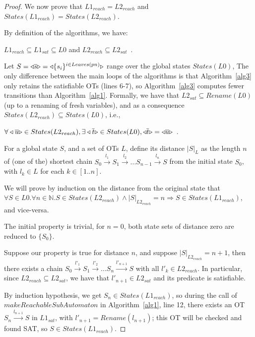 \documentclass[smallcondensed]{svjour3}
\begin{document}
\begin{proof}
\smallskip
We now prove that $L1_{reach}=L2_{reach}$ and
$States(L1_{reach})=States(L2_{reach})$.

By definition of the algorithms, we have:

\centerline{$L1_{reach} \subseteq L1_{sat} \subseteq L0$ \qquad \mbox{and}\qquad
$L2_{reach}\subseteq  L2_{sat}$\ .}

\smallskip
Let $S=\triangleleft{\overline{s}}\triangleright=\triangleleft{\{s_{i}\}^{i\in Leaves(pn)}}\triangleright$
range over the global states $States(L0)$, 
The only difference between the main loops of the algorithms is that 
Algorithm~\ref{alg3} only retains the satisfiable OTs (lines 6-7), so 
Algorithm~\ref{alg3} computes fewer transitions than
Algorithm~\ref{alg1}. Formally, we have that
$L2_{sat} \subseteq Rename(L0)$ (up to a renaming of fresh variables), and as a consequence $States(L2_{reach})\subseteq  States(L0)$, i.e.,\\
\centerline{$\forall \triangleleft{\overline{u}}\triangleright\in States(L2_{reach}), \exists\triangleleft{\overline{t}}\triangleright\in States(L0), \triangleleft{\overline{t}}\triangleright=\triangleleft{\overline{u}}\triangleright$\ .}

For a global state $S$, and a set of OTs $L$, define its distance
$|S|_L$ as the length $n$ of (one of the) shortest chain
$S_0\xrightarrow{l_1}S_1\xrightarrow{l_2}...S_{n-1}\xrightarrow{l_{n}}S$
  from the initial state $S_0$, with $l_k \in L$ for each $k\in [1..n]$.

\medskip
We will prove by induction on the distance from the original state
that\linebreak $\forall S \in L0. \forall n \in \mathbb{N}. S \in States(L2_{reach}) \land |S|_{L2_{reach}}=n \Rightarrow S
\in States(L1_{reach})$, and vice-versa.

  The initial property is trivial, for $n=0$, both state sets of
  distance zero are reduced to $\{S_0\}$.

  Suppose our property is true for distance $n$, and
  suppose $|S|_{L2_{reach}}=n+1$, then there exists a chain
  $S_0\xrightarrow{l'_1}S_1\xrightarrow{l'_2}...S_{n}\xrightarrow{l'_{n+1}}S$
  with all $l'_k \in L2_{reach}$. In particular, since
  $L2_{reach}\subseteq L2_{sat}$, we have that $l'_{n+1} \in L2_{sat}$ and
  its predicate is satisfiable.
  
  By induction hypothesis, we get $S_{n} \in States(L1_{reach})$, so during the
  call of $makeReachableSubAutomaton$ in Algorithm~\ref{alg1}, line
  12, there exists an OT
  $S_n \xrightarrow{l_{n+1}}S$ in $L1_{sat}$, with $l'_{n+1}=Rename(l_{n+1})$;
  this OT will be checked and found SAT, so
  $S \in States(L1_{reach})$. 


\end{proof}
\end{document}
